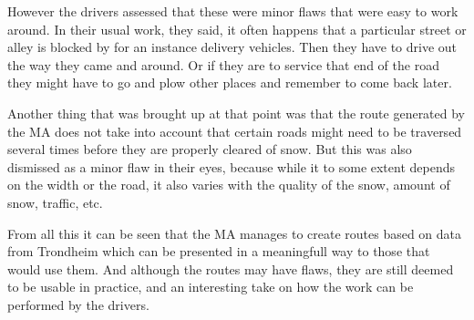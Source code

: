 However the drivers assessed that these were minor flaws that were easy to work around. In their usual work, they said, it often happens that a particular street or alley is blocked by for an instance delivery vehicles. Then they have to drive out the way they came and around. Or if they are to service that end of the road they might have to go and plow other places and remember to come back later.

Another thing that was brought up at that point was that the route generated by the MA does not take into account that certain roads might need to be traversed several times before they are properly cleared of snow. But this was also dismissed as a minor flaw in their eyes, because while it to some extent depends on the width or the road, it also varies with the quality of the snow, amount of snow, traffic, etc.

From all this it can be seen that the MA manages to create routes based on data from Trondheim which can be presented in a meaningfull way to those that would use them. And although the routes may have flaws, they are still deemed to be usable in practice, and an interesting take on how the work can be performed by the drivers.

\cleardoublepage
